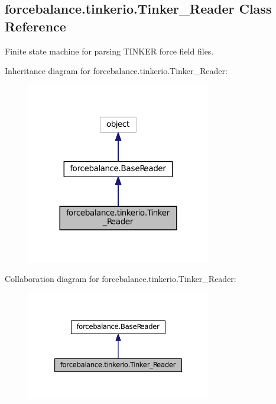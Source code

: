 \hypertarget{classforcebalance_1_1tinkerio_1_1Tinker__Reader}{\subsection{forcebalance.\-tinkerio.\-Tinker\-\_\-\-Reader Class Reference}
\label{classforcebalance_1_1tinkerio_1_1Tinker__Reader}
}


Finite state machine for parsing T\-I\-N\-K\-E\-R force field files.  




Inheritance diagram for forcebalance.\-tinkerio.\-Tinker\-\_\-\-Reader\-:\nopagebreak
\begin{figure}[H]
\begin{center}
\leavevmode
\includegraphics[width=228pt]{classforcebalance_1_1tinkerio_1_1Tinker__Reader__inherit__graph}
\end{center}
\end{figure}


Collaboration diagram for forcebalance.\-tinkerio.\-Tinker\-\_\-\-Reader\-:\nopagebreak
\begin{figure}[H]
\begin{center}
\leavevmode
\includegraphics[width=228pt]{classforcebalance_1_1tinkerio_1_1Tinker__Reader__coll__graph}
\end{center}
\end{figure}

